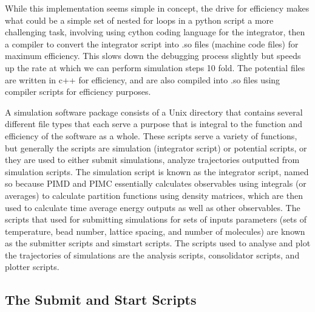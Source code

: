 \documentclass{ece}
\begin{document}
While this implementation seems simple in concept, the drive for efficiency makes what could be a simple set of nested for loops in a python script a more challenging task, involving using cython coding
language for the integrator, then a compiler to convert the integrator script into .so files (machine code files) for maximum efficiency. This slows down the debugging process slightly but speeds up the rate at which we can perform simulation steps 10 fold. The potential files are written in c++ for efficiency, and are also compiled into .so files using compiler scripts for efficiency purposes.

A simulation software package consists of a Unix directory that contains several different file types that each serve a purpose that is integral to the function and efficiency of the software as a whole. These scripts serve a variety of functions, but generally the scripts are simulation (integrator script) or potential scripts, or they are used to either submit simulations, analyze trajectories outputted from simulation scripts. The simulation script is known as the integrator script, named so because \gls{PIMD} and \gls{PIMC} essentially calculates observables using integrals (or averages) to calculate partition functions using density matrices, which are then used to calculate time average energy outputs as well as other observables. The scripts that used for submitting simulations for sets of inputs parameters (sets of temperature, bead number, lattice spacing, and number of molecules) are known as the submitter scripts and simstart scripts. The scripts used to analyse and plot the trajectories of simulations are the analysis scripts, consolidator scripts, and plotter scripts. 

\subsection{The Submit and Start Scripts}
\end{document}

